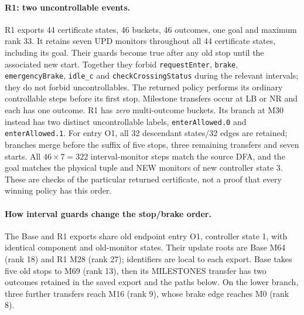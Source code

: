 \documentclass[11pt]{article}
\begin{document}
\paragraph{R1: two uncontrollable events.}
R1 exports 44 certificate states, 46 buckets, 46 outcomes, one goal and maximum rank 33. It retains seven UPD monitors throughout all 44 certificate states, including its goal. Their guards become true after any old stop until the associated new start. Together they forbid \texttt{requestEnter}, \texttt{brake}, \texttt{emergencyBrake}, \texttt{idle\_c} and \texttt{checkCrossingStatus} during the relevant intervals; they do not forbid uncontrollables. The returned policy performs its ordinary controllable steps before its first stop. Milestone transfers occur at LB or NR and each has one outcome. R1 has \emph{zero} multi-outcome buckets. Its branch at M30 instead has two distinct uncontrollable labels, \texttt{enterAllowed.0} and \texttt{enterAllowed.1}. For entry O1, all 32 descendant states/32 edges are retained; branches merge before the suffix of five stops, three remaining transfers and seven starts. All $46\times7=322$ interval-monitor steps match the source DFA, and the goal matches the physical tuple and NEW monitors of new controller state 3. These are checks of the particular returned certificate, not a proof that every winning policy has this order.

\paragraph{How interval guards change the stop/brake order.}
The Base and R1 exports share old endpoint entry O1, controller state 1, with identical component and old-monitor states. Their update roots are Base M64 (rank 18) and R1 M28 (rank 27); identifiers are local to each export. Base takes five old stops to M69 (rank 13), then its MILESTONES transfer has two outcomes retained in the saved export and the paths below. On the lower branch, three further transfers reach M16 (rank 9), whose brake edge reaches M0 (rank 8).
\end{document}
